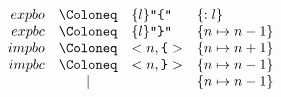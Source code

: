 \begin{align*}
  \begin{array}{rcll}
    {expbo}
    & \Coloneq & \{l\} \text{\texttt{\textquotedbl\{\textquotedbl}} &\{:l\} \\
    {expbc}
    & \Coloneq & \{l\} \text{\texttt{\textquotedbl\}\textquotedbl}} &\{n \mapsto n - 1\} \\
    {impbo}
    & \Coloneq & <n, \text{\texttt{\{}}> &\{n \mapsto n + 1\} \\
    {impbc}
    & \Coloneq & <n, \text{\texttt{\}}}> &\{n \mapsto n - 1\} \\
    & \mid & &\{n \mapsto n - 1\}
  \end{array}
\end{align*}
